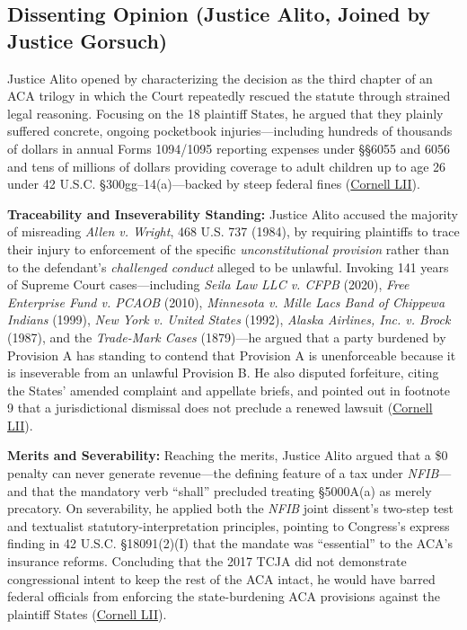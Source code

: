 \documentclass[12pt]{article}
\begin{document}
\subsection{Dissenting Opinion (Justice Alito, Joined by Justice Gorsuch)}

Justice Alito opened by characterizing the decision as the third chapter of an ACA trilogy in which the Court repeatedly rescued the statute through strained legal reasoning. Focusing on the 18 plaintiff States, he argued that they plainly suffered concrete, ongoing pocketbook injuries---including hundreds of thousands of dollars in annual Forms 1094/1095 reporting expenses under \S\S 6055 and 6056 and tens of millions of dollars providing coverage to adult children up to age 26 under 42 U.S.C. \S 300gg--14(a)---backed by steep federal fines (\href{https://www.law.cornell.edu/supremecourt/text/19-840}{Cornell LII}).

\textbf{Traceability and Inseverability Standing:} Justice Alito accused the majority of misreading \textit{Allen v. Wright}, 468 U.S. 737 (1984), by requiring plaintiffs to trace their injury to enforcement of the specific \textit{unconstitutional provision} rather than to the defendant's \textit{challenged conduct} alleged to be unlawful. Invoking 141 years of Supreme Court cases---including \textit{Seila Law LLC v. CFPB} (2020), \textit{Free Enterprise Fund v. PCAOB} (2010), \textit{Minnesota v. Mille Lacs Band of Chippewa Indians} (1999), \textit{New York v. United States} (1992), \textit{Alaska Airlines, Inc. v. Brock} (1987), and the \textit{Trade-Mark Cases} (1879)---he argued that a party burdened by Provision A has standing to contend that Provision A is unenforceable because it is inseverable from an unlawful Provision B. He also disputed forfeiture, citing the States' amended complaint and appellate briefs, and pointed out in footnote 9 that a jurisdictional dismissal does not preclude a renewed lawsuit (\href{https://www.law.cornell.edu/supremecourt/text/19-840}{Cornell LII}).

\textbf{Merits and Severability:} Reaching the merits, Justice Alito argued that a \$0 penalty can never generate revenue---the defining feature of a tax under \textit{NFIB}---and that the mandatory verb ``shall'' precluded treating \S 5000A(a) as merely precatory. On severability, he applied both the \textit{NFIB} joint dissent's two-step test and textualist statutory-interpretation principles, pointing to Congress's express finding in 42 U.S.C. \S 18091(2)(I) that the mandate was ``essential'' to the ACA's insurance reforms. Concluding that the 2017 TCJA did not demonstrate congressional intent to keep the rest of the ACA intact, he would have barred federal officials from enforcing the state-burdening ACA provisions against the plaintiff States (\href{https://www.law.cornell.edu/supremecourt/text/19-840}{Cornell LII}).
\end{document}
